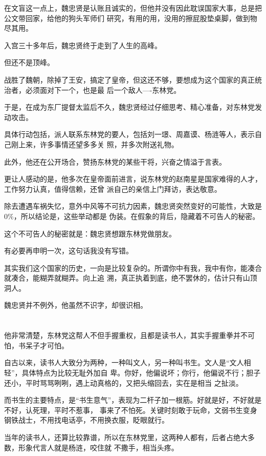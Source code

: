 \documentclass[11pt,a4paper,onecolumn]{article}
\begin{document}
在文盲这一点上，魏忠贤是认账且诚实的，但他并没有因此耽误国家大事，总是把公文带回家，给他的狗头军师们
研究，有用的用，没用的擦屁股垫桌脚，做到物尽其用。

入宫三十多年后，魏忠贤终于走到了人生的高峰。

但还不是顶峰。

战胜了魏朝，除掉了王安，搞定了皇帝，但这还不够，要想成为这个国家的真正统治者，必须面对下一个，也是最
后一个敌人----东林党。

于是，在成为东厂提督太监后不久，魏忠贤经过仔细思考、精心准备，对东林党发动攻击。

具体行动包括，派人联系东林党的要人，包括刘一璟、周嘉谟、杨涟等人，表示自己刚上来，许多事情还望多多关
照，并多次附送礼物。

此外，他还在公开场合，赞扬东林党的某些干将，兴奋之情溢于言表。

更让人感动的是，他多次在皇帝面前进言，说东林党的赵南星是国家难得的人才，工作努力认真，值得信赖，还曾
派自己的亲信上门拜访，表达敬意。

除去遭遇车祸失忆，意外中风等不可抗力因素，魏忠贤突然变好的可能性，大致是0\%，所以结论是，这些举动都是
伪装。在假象的背后，隐藏着不可告人的秘密。

这个不可告人的秘密就是：魏忠贤想跟东林党做朋友。

有必要再申明一次，这句话我没有写错。

其实我们这个国家的历史，一向是比较复杂的。所谓你中有我，我中有你，能凑合就凑合，能糊弄就糊弄。向上追
溯，真正执着到底，绝不罢休的，估计只有山顶洞人。

魏忠贤并不例外，他虽然不识字，却很识相。

\section[\thesection]{}

他非常清楚，东林党这帮人不但手握重权，且都是读书人，其实手握重拳并不可怕，书呆子才可怕。

自古以来，读书人大致分为两种，一种叫文人，另一种叫书生。文人是``文人相轻''，具体特点为比较无耻外加自
卑。你好，他偏说坏；你行，他偏说不行；胆子还小，平时骂骂咧咧，遇上动真格的，又把头缩回去，实在是相当
之扯淡。

而书生的主要特点，是``书生意气''，表现为二杆子加一根筋。好就是好，不好就是不好，认死理，平时不惹事，
事来了不怕死。关键时刻敢于玩命，文弱书生变身钢铁战士，不用找电话亭，不用换衣服，眨眼就行。

当年的读书人，还算比较靠谱，所以在东林党里，这两种人都有，后者占绝大多数，形象代言人就是杨涟，咬住就
不撒手，相当头疼。
\end{document}
